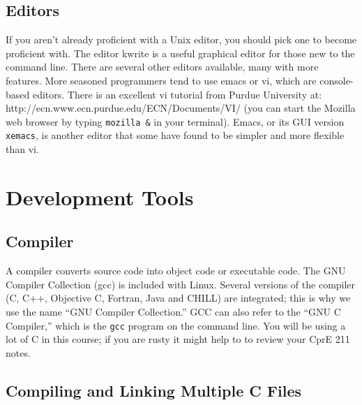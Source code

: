 \documentclass[letterpaper,10pt]{article}
\newcommand{\cmd}[1]{\texttt{#1}}
\begin{document}
\subsection{Editors}
If you aren't already proficient with a Unix editor, you should pick one to become proficient with. The editor kwrite is a useful graphical editor for those new to the command line. There are several other editors available, many with more features.
More seasoned programmers tend to use emacs or vi, which are console-based editors. There is an excellent vi tutorial from Purdue University at: http://ecn.www.ecn.purdue.edu/ECN/Documents/VI/ (you can start the Mozilla web browser by typing \cmd{mozilla \&} in your terminal). Emacs, or its GUI version \texttt{xemacs}, is another editor that some have found to be simpler and more flexible than vi.

\section{Development Tools}
\subsection{Compiler}
A compiler converts source code into object code or executable code. The GNU Compiler Collection (gcc) is included with Linux. Several versions of the compiler (C, C++, Objective C, Fortran, Java and CHILL) are integrated; this is why we use the name ``GNU Compiler Collection.'' GCC can also refer to the ``GNU C Compiler,'' which is the \cmd{gcc} program on the command line. You will be using a lot of C in this course; if you are rusty it might help to to review your CprE 211 notes.

\subsection{Compiling and Linking Multiple C Files}
\end{document}
